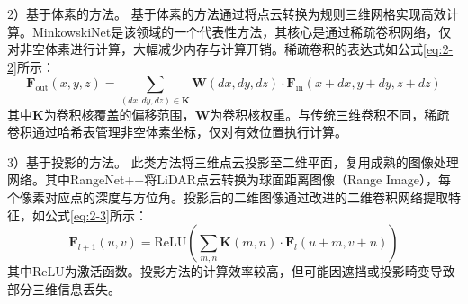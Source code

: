 2）基于体素的方法。
基于体素的方法通过将点云转换为规则三维网格实现高效计算。MinkowskiNet是该领域的一个代表性方法，其核心是通过稀疏卷积网络，仅对非空体素进行计算，大幅减少内存与计算开销。稀疏卷积的表达式如公式\eqref{eq:2-2}所示：
\begin{equation}
    \label{eq:2-2}
    \mathbf{F}_{\text{out}}(x,y,z) = \sum_{(dx,dy,dz) \in \mathbf{K}} \mathbf{W}(dx,dy,dz) \cdot \mathbf{F}_{\text{in}}(x+dx, y+dy, z+dz)
\end{equation}
其中$\mathbf{K}$为卷积核覆盖的偏移范围，$\mathbf{W}$为卷积核权重。与传统三维卷积不同，稀疏卷积通过哈希表管理非空体素坐标，仅对有效位置执行计算。%


3）基于投影的方法。
此类方法将三维点云投影至二维平面，复用成熟的图像处理网络。其中RangeNet++将LiDAR点云转换为球面距离图像（Range Image），每个像素对应点的深度与方位角。投影后的二维图像通过改进的二维卷积网络提取特征，如公式\eqref{eq:2-3}所示：
\begin{equation}
    \label{eq:2-3}
    \mathbf{F}_{l+1}(u,v) = \text{ReLU}\left(\sum_{m,n} \mathbf{K}(m,n) \cdot \mathbf{F}_l(u+m, v+n)\right)
\end{equation}
其中ReLU为激活函数。投影方法的计算效率较高，但可能因遮挡或投影畸变导致部分三维信息丢失。%

